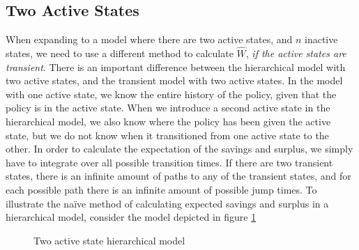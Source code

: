 \documentclass[12pt]{article}
\begin{document}
\subsection*{Two Active States}
When expanding to a model where there are two active states, and $n$ inactive states, we need to use a different method to calculate $\hat{W}$, \textit{if the active states are transient}. There is an important difference between the hierarchical model with two active states, and the transient model with two active states. In the model with one active state, we know the entire history of the policy, given that the policy is in the active state. When we introduce a second active state in the hierarchical model, we also know where the policy has been given the active state, but we do not know when it transitioned from one active state to the other. In order to calculate the expectation of the savings and surplus, we simply have to integrate over all possible transition times. If there are two transient states, there is an infinite amount of paths to any of the transient states, and for each possible path there is an infinite amount of possible jump times.
To illustrate the naïve method of calculating expected savings and surplus in a hierarchical model, consider the model depicted in figure \ref{fig:2}
 \def\PlA{(0,0)}
\begin{figure}[H]
\begin{center}
\caption{Two active state hierarchical model}
\label{fig:2}
\end{center}
\end{figure}
\end{document}
